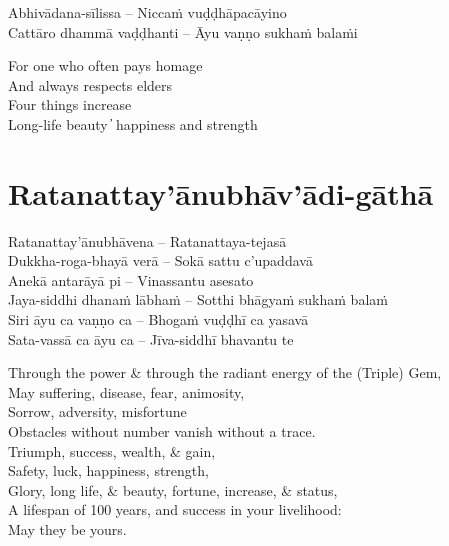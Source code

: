 
\begin{twochants}
  Abhivādana-sīlissa – Niccaṁ vuḍḍhāpacāyino\\
  Cattāro dhammā vaḍḍhanti – Āyu vaṇṇo sukhaṁ balaṁi
\end{twochants}

\begin{english}
  For one who often pays homage\\
  And always respects elders\\
  Four things increase\\
  Long-life beauty  ̓  happiness and strength
\end{english}


\section{Ratanattay'ānubhāv'ādi-gāthā}

\begin{twochants}
  Ratanattay'ānubhāvena – Ratanattaya-tejasā\\
  Dukkha-roga-bhayā verā – Sokā sattu c'upaddavā\\
  Anekā antarāyā pi – Vinassantu asesato\\
  Jaya-siddhi dhanaṁ lābhaṁ – Sotthi bhāgyaṁ sukhaṁ balaṁ\\
  Siri āyu ca vaṇṇo ca – Bhogaṁ vuḍḍhī ca yasavā\\
  Sata-vassā ca āyu ca – Jīva-siddhī bhavantu te
\end{twochants}

\begin{english}
  Through the power \& through the radiant energy of the (Triple) Gem,\\
  May suffering, disease, fear, animosity,\\
  Sorrow, adversity, misfortune\\
  Obstacles without number vanish without a trace.\\
  Triumph, success, wealth, \& gain,\\
  Safety, luck, happiness, strength,\\
  Glory, long life, \& beauty, fortune, increase, \& status,\\
  A lifespan of 100 years, and success in your livelihood:\\
  May they be yours.
\end{english}

